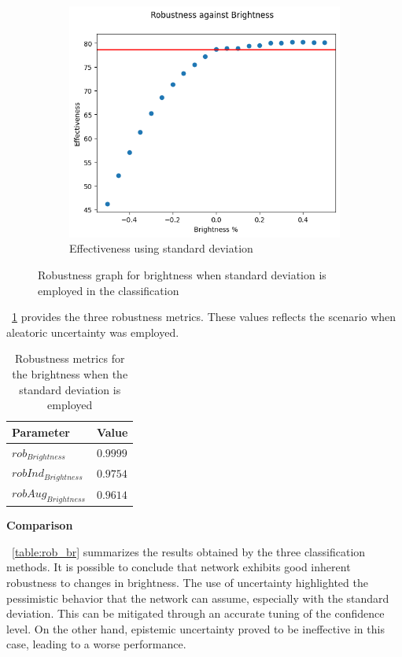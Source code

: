 \begin{figure}[h]
	\begin{subfigure}{.33\textwidth}
		\centering
		\includegraphics[width=0.9\linewidth]{ImageFiles/EvalBNN/BR/VU/eff}
		\caption{Effectiveness using standard deviation}
		\label{fig:br_vu_eff}
	\end{subfigure}
	\caption{Robustness graph for brightness when standard deviation is employed in the classification}
	\label{fig:br_vu}
\end{figure}

\Tab~\ref{table:rob_br_vu} provides the three robustness metrics. These values reflects the scenario when aleatoric uncertainty was employed.

\begin{table}[h]
	\centering
	\begin{tabular}{|| l | l ||} 
		\hline
		\textbf{Parameter} & \textbf{Value} \\
		\hline
		\hline
		$rob_{Brightness}$ & $0.9999$ \\
		$robInd_{Brightness}$ & $0.9754$ \\
		$robAug_{Brightness}$ & $0.9614$ \\	
		\hline
	\end{tabular}	
	\caption{Robustness metrics for the brightness when the standard deviation is employed}
	\label{table:rob_br_vu}
\end{table}

\vspace{0.3cm}
\textbf{Comparison}
\vspace{0.1cm}

\Tab~\ref{table:rob_br} summarizes the results obtained by the three classification methods. It is possible to conclude that network exhibits good inherent robustness to changes in brightness. The use of uncertainty highlighted the pessimistic behavior that the network can assume, especially with the standard deviation. This can be mitigated through an accurate tuning of the confidence level. On the other hand, epistemic uncertainty proved to be ineffective in this case, leading to a worse performance.

